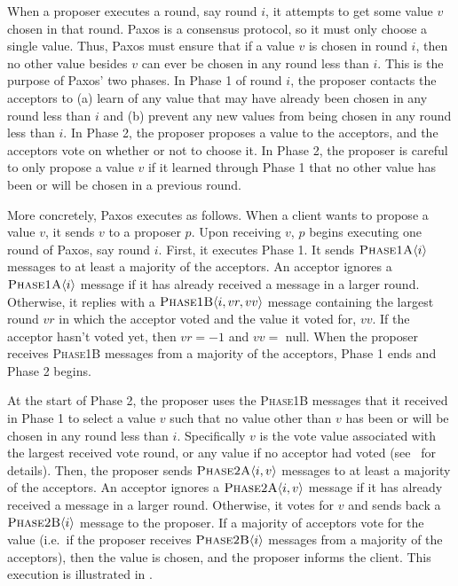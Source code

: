 {}

When a proposer executes a round, say round $i$, it attempts to get some value
$v$ chosen in that round. Paxos is a consensus protocol, so it must only choose
a single value. Thus, Paxos must ensure that if a value $v$ is chosen in round
$i$, then no other value besides $v$ can ever be chosen in any round less than
$i$. This is the purpose of Paxos' two phases. In Phase 1 of round $i$, the
proposer contacts the acceptors to (a) learn of any value that may have already
been chosen in any round less than $i$ and (b) prevent any new values from
being chosen in any round less than $i$. In Phase 2, the proposer proposes a
value to the acceptors, and the acceptors vote on whether or not to choose it.
In Phase 2, the proposer is careful to only propose a value $v$ if it learned
through Phase 1 that no other value has been or will be chosen in a previous
round.

More concretely, Paxos executes as follows. When a client wants to propose a
value $v$, it sends $v$ to a proposer $p$. Upon receiving $v$, $p$ begins
executing one round of Paxos, say round $i$. First, it executes Phase 1. It
sends $\textsc{Phase1A}\langle{i}\rangle$ messages to at least a majority of the acceptors. An
acceptor ignores a $\textsc{Phase1A}\langle{i}\rangle$ message if it has already received a message
in a larger round. Otherwise, it replies with a $\textsc{Phase1B}\langle{i, vr, vv}\rangle$ message
containing the largest round $vr$ in which the acceptor voted and the value it
voted for, $vv$. If the acceptor hasn't voted yet, then $vr = -1$ and $vv = $
\textsf{null}. When the proposer receives \textsc{Phase1B} messages from a
majority of the acceptors, Phase 1 ends and Phase 2 begins.

At the start of Phase 2, the proposer uses the \textsc{Phase1B} messages that
it received in Phase 1 to select a value $v$ such that no value other than $v$
has been or will be chosen in any round less than $i$. Specifically $v$ is the
vote value associated with the largest received vote round, or any value if no
acceptor had voted (see~\cite{lamport2001paxos} for details). Then, the
proposer sends $\textsc{Phase2A}\langle{i, v}\rangle$ messages to at least a majority of the
acceptors. An acceptor ignores a $\textsc{Phase2A}\langle{i, v}\rangle$ message if it has already
received a message in a larger round. Otherwise, it votes for $v$ and sends
back a $\textsc{Phase2B}\langle{i}\rangle$ message to the proposer. If a majority of acceptors vote
for the value (i.e.\ if the proposer receives $\textsc{Phase2B}\langle{i}\rangle$ messages from a
majority of the acceptors), then the value is chosen, and the proposer informs
the client. This execution is illustrated in .

